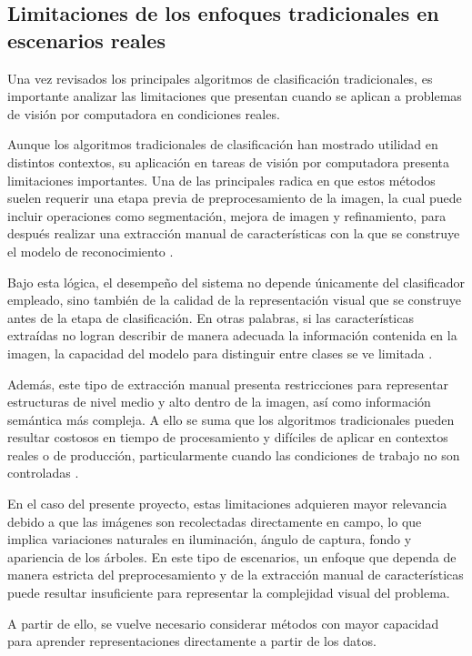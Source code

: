 \subsection{Limitaciones de los enfoques tradicionales en escenarios reales}

Una vez revisados los principales algoritmos de clasificación tradicionales, es importante analizar las limitaciones que presentan cuando se aplican a problemas de visión por computadora en condiciones reales.

Aunque los algoritmos tradicionales de clasificación han mostrado utilidad en distintos contextos, su aplicación en tareas de visión por computadora presenta limitaciones importantes. Una de las principales radica en que estos métodos suelen requerir una etapa previa de preprocesamiento de la imagen, la cual puede incluir operaciones como segmentación, mejora de imagen y refinamiento, para después realizar una extracción manual de características con la que se construye el modelo de reconocimiento \cite{liu2022high_similarity}.

Bajo esta lógica, el desempeño del sistema no depende únicamente del clasificador empleado, sino también de la calidad de la representación visual que se construye antes de la etapa de clasificación. En otras palabras, si las características extraídas no logran describir de manera adecuada la información contenida en la imagen, la capacidad del modelo para distinguir entre clases se ve limitada \cite{liu2022high_similarity}.

Además, este tipo de extracción manual presenta restricciones para representar estructuras de nivel medio y alto dentro de la imagen, así como información semántica más compleja. A ello se suma que los algoritmos tradicionales pueden resultar costosos en tiempo de procesamiento y difíciles de aplicar en contextos reales o de producción, particularmente cuando las condiciones de trabajo no son controladas \cite{liu2022high_similarity}.

En el caso del presente proyecto, estas limitaciones adquieren mayor relevancia debido a que las imágenes son recolectadas directamente en campo, lo que implica variaciones naturales en iluminación, ángulo de captura, fondo y apariencia de los árboles. En este tipo de escenarios, un enfoque que dependa de manera estricta del preprocesamiento y de la extracción manual de características puede resultar insuficiente para representar la complejidad visual del problema. 

A partir de ello, se vuelve necesario considerar métodos con mayor capacidad para aprender representaciones directamente a partir de los datos.


